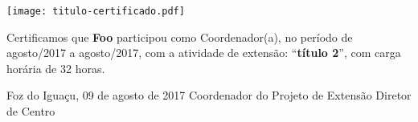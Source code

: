 \documentclass[a4paper,brazil]{article}%
\begin{document}
%
\normalsize%

\pagestyle{empty}
\BgThispage
%
\vspace*{2cm}%
\begin{flushright}%
\texttt{[image: titulo-certificado.pdf]}%
\linebreak%
\end{flushright}%
\vspace*{-1cm}%
\Large%
%


        Certificamos que \textbf{Foo} participou como Coordenador(a), no período de agosto/2017 a agosto/2017, com a atividade de extensão: ``\textbf{título 2}'', com carga horária de 32 horas.

\vspace*{1.5cm}%
\hspace*{7cm}%
\begin{minipage}{\widthof{Foz do Iguaçu, 09 de agosto de 2017}}%
\begin{center}%
Foz do Iguaçu, 09 de agosto de 2017%
\newline%
\newline%
\newline%
Coordenador do Projeto de Extensão%
\newline%
\newline%
\newline%
Diretor de Centro%
\end{center}%
\end{minipage}%
\end{document}
